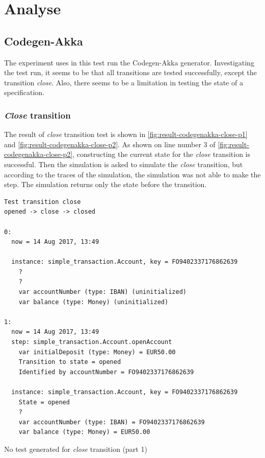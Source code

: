 \section{Analyse}

\subsection{Codegen-Akka}
The experiment uses in this test run the Codegen-Akka generator.
Investigating the test run, it seems to be that all transitions are tested
successfully, except the transition \textit{close}. Also, there seems to be a
limitation in testing the state of a specification.

\subsubsection{\textit{Close} transition}\label{sec:close-no-test-codegenakka}

The result of \textit{close} transition test is shown in
\autoref{fig:result-codegenakka-close-p1} and \autoref{fig:result-codegenakka-close-p2}.
As shown on line number 3 of \autoref{fig:result-codegenakka-close-p2},
constructing the current state for the \textit{close} transition is successful. Then the
simulation is asked to simulate the \textit{close} transition, but according to the
traces of the simulation, the simulation was not able to make the step. The
simulation returns only the state before the transition.

\begin{sourcecode}[h!]
\begin{lstlisting}[]
Test transition close
opened -> close -> closed

0:
  now = 14 Aug 2017, 13:49

  instance: simple_transaction.Account, key = FO9402337176862639
    ?
    ?
    var accountNumber (type: IBAN) (uninitialized)
    var balance (type: Money) (uninitialized)

1:
  now = 14 Aug 2017, 13:49
  step: simple_transaction.Account.openAccount
    var initialDeposit (type: Money) = EUR50.00
    Transition to state = opened
    Identified by accountNumber = FO9402337176862639

  instance: simple_transaction.Account, key = FO9402337176862639
    State = opened
    ?
    var accountNumber (type: IBAN) = FO9402337176862639
    var balance (type: Money) = EUR50.00
\end{lstlisting}
\caption{No test generated for \textit{close} transition (part 1)}\label{fig:result-codegenakka-close-p1}
\end{sourcecode}
\FloatBarrier

